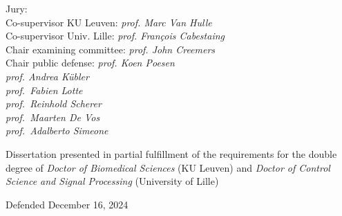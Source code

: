 \begin{titlepage}
    \vfill
    \begin{minipage}[b]{.6\textwidth}
      \raggedright
      \small
      Jury: \\
      Co-supervisor KU Leuven: \emph{prof. Marc Van Hulle} \\
      Co-supervisor Univ. Lille: \emph{prof. François Cabestaing} \\
      Chair examining committee: \emph{prof. John Creemers} \\
      Chair public defense: \emph{prof. Koen Poesen} \\
      \emph{prof. Andrea K\"ubler} \\
      \emph{prof.\ Fabien Lotte} \\
      \emph{prof.\ Reinhold Scherer} \\
      \emph{prof.\ Maarten De Vos} \\
      \emph{prof.\ Adalberto Simeone}
    \end{minipage}\hfill%
    \begin{minipage}[b]{.31\textwidth}
        \raggedright
        \small
        Dissertation presented in partial fulfillment of the requirements for
        the double degree of \emph{Doctor of Biomedical Sciences} (KU Leuven)
        and \emph{Doctor of Control Science and Signal Processing} (University
        of Lille)
    \end{minipage}
    \bigskip

    \centering
    Defended December 16, 2024

\end{titlepage}
\clearpage
